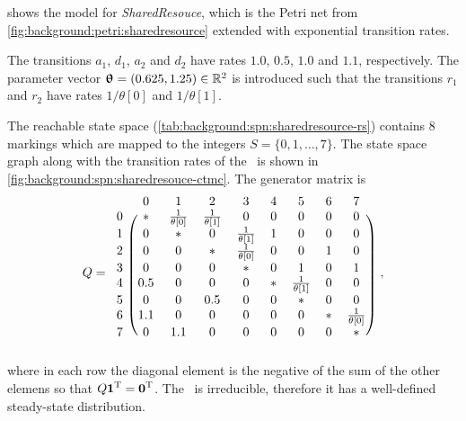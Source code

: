 \begin{runningExample}
   shows the  
  model for \emph{SharedResouce}, which is the Petri net
  from \vref{fig:background:petri:sharedresource} extended with
  exponential transition rates.

  The transitions $a_1$, $d_1$, $a_2$ and $d_2$ have rates $1.0$,
  $0.5$, $1.0$ and $1.1$, respectively. The parameter vector
  $\bm{\mathrm{\uptheta}} = (0.625, 1.25) \in \mathbb{R}^2$ is introduced such
  that the transitions $r_1$ and $r_2$ have rates $1 / \theta[0]$ and
  $1 / \theta[1]$.

  The reachable state space
  (\cref{tab:background:spn:sharedresource-rs}) contains $8$ markings
  which are mapped to the integers $S = \{0, 1, \ldots, 7\}$. The
  state space graph along with the transition rates of the \CTMC\ is
  shown in \cref{fig:background:spn:sharedresouce-ctmc}. The generator
  matrix is
  \begin{equation}
    Q =
    \begin{blockarray}{l*{8}{c}}
      & 0 & 1 & 2 & 3 & 4 & 5 & 6 & 7 \\
      \begin{block}{l(*{8}{c})}
        0 & \ast & \frac{1}{\theta[0]} & \frac{1}{\theta[1]} & 0 & 0 & 0 & 0 & 0 \\
        1 & 0 & \ast & 0 & \frac{1}{\theta[1]} & 1 & 0 & 0 & 0 \\
        2 & 0 & 0 & \ast &  \frac{1}{\theta[0]} & 0 & 0 & 1 & 0 \\
        3 & 0 & 0 & 0 & \ast & 0 & 1 & 0 & 1 \\
        4 & 0.5 & 0 & 0 & 0 & \ast & \frac{1}{\theta[1]} & 0 & 0 \\
        5 & 0 & 0 & 0.5 & 0 & 0 & \ast & 0 & 0 \\
        6 & 1.1 & 0 & 0 & 0 & 0 & 0 & \ast & \frac{1}{\theta[0]} \\
        7 & 0 & 1.1 & 0 & 0 & 0 & 0 & 0 & \ast \\
      \end{block}
    \end{blockarray}\;\;\text,
  \end{equation}
  where in each row the diagonal element is the negative of the sum of
  the other elemens so that $Q \bm{\mathrm{1}}^{\mathrm{T}} = \bm{\mathrm{0}}^{\mathrm{T}}$. The \CTMC\ is
  irreducible, therefore it has a well-defined steady-state distribution.
\end{runningExample}

